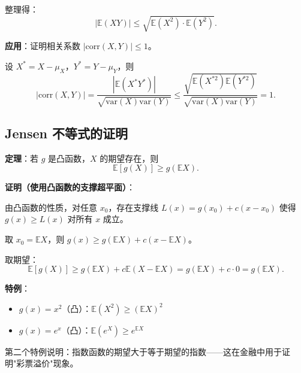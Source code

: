 整理得：
\[
|\mathbb{E}(XY)| \leq \sqrt{\mathbb{E}(X^2) \cdot \mathbb{E}(Y^2)}.
\]

\textbf{应用}：证明相关系数 $|\text{corr}(X,Y)| \leq 1$。

设 $X^* = X - \mu_X$，$Y^* = Y - \mu_Y$，则
\[
|\text{corr}(X,Y)| = \frac{|\mathbb{E}(X^* Y^*)|}{\sqrt{\text{var}(X) \text{var}(Y)}} \leq \frac{\sqrt{\mathbb{E}(X^{*2}) \mathbb{E}(Y^{*2})}}{\sqrt{\text{var}(X) \text{var}(Y)}} = 1.
\]

\subsection{Jensen 不等式的证明}\label{sec:derivation-jensen}

\textbf{定理}：若 $g$ 是凸函数，$X$ 的期望存在，则
\[
\mathbb{E}[g(X)] \geq g(\mathbb{E}X).
\]

\textbf{证明（使用凸函数的支撑超平面）}：

由凸函数的性质，对任意 $x_0$，存在支撑线 $L(x) = g(x_0) + c(x - x_0)$ 使得 $g(x) \geq L(x)$ 对所有 $x$ 成立。

取 $x_0 = \mathbb{E}X$，则 $g(x) \geq g(\mathbb{E}X) + c(x - \mathbb{E}X)$。

取期望：
\[
\mathbb{E}[g(X)] \geq g(\mathbb{E}X) + c\mathbb{E}(X - \mathbb{E}X) = g(\mathbb{E}X) + c \cdot 0 = g(\mathbb{E}X).
\]

\textbf{特例}：
\begin{itemize}
\item $g(x) = x^2$（凸）：$\mathbb{E}(X^2) \geq (\mathbb{E}X)^2$
\item $g(x) = e^x$（凸）：$\mathbb{E}(e^X) \geq e^{\mathbb{E}X}$
\end{itemize}

第二个特例说明：指数函数的期望大于等于期望的指数——这在金融中用于证明"彩票溢价"现象。
